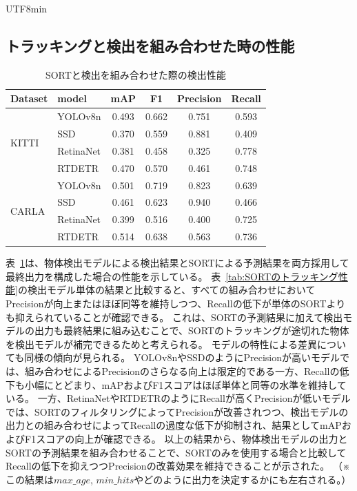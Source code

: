 \documentclass[conference, dvipdfmx]{IEEEtran}
\begin{document}
\begin{CJK}{UTF8}{min}
\subsection{トラッキングと検出を組み合わせた時の性能}
\begin{table}[htbp]
    \centering
    \caption{SORTと検出を組み合わせた際の検出性能}
    \begin{tabular}{llcccc}
         \toprule
         Dataset & 
         model        &  mAP  & F1    & Precision & Recall \\
         \midrule
         \multirow{4}{*}{KITTI} 
         & YOLOv8n    & 0.493 & 0.662 & 0.751     & 0.593 \\
         & SSD        & 0.370 & 0.559 & 0.881     & 0.409 \\
         & RetinaNet  & 0.381 & 0.458 & 0.325     & 0.778 \\
         & RTDETR     & 0.470 & 0.570 & 0.461     & 0.748 \\
         \midrule
         \multirow{4}{*}{CARLA}
         & YOLOv8n    & 0.501 & 0.719 & 0.823     & 0.639 \\
         & SSD        & 0.461 & 0.623 & 0.940     & 0.466 \\
         & RetinaNet  & 0.399 & 0.516 & 0.400     & 0.725 \\
         & RTDETR     & 0.514 & 0.638 & 0.563     & 0.736 \\
         \bottomrule
    \end{tabular}
    \label{tab:SORTと組み合わせた検出性能}
\end{table}
表~\ref{tab:SORTと組み合わせた検出性能}は、物体検出モデルによる検出結果とSORTによる予測結果を両方採用して最終出力を構成した場合の性能を示している。
表~\ref{tab:SORTのトラッキング性能}の検出モデル単体の結果と比較すると、すべての組み合わせにおいてPrecisionが向上またはほぼ同等を維持しつつ、Recallの低下が単体のSORTよりも抑えられていることが確認できる。
これは、SORTの予測結果に加えて検出モデルの出力も最終結果に組み込むことで、SORTのトラッキングが途切れた物体を検出モデルが補完できるためと考えられる。
モデルの特性による差異についても同様の傾向が見られる。
YOLOv8nやSSDのようにPrecisionが高いモデルでは、組み合わせによるPrecisionのさらなる向上は限定的である一方、Recallの低下も小幅にとどまり、mAPおよびF1スコアはほぼ単体と同等の水準を維持している。
一方、RetinaNetやRTDETRのようにRecallが高くPrecisionが低いモデルでは、SORTのフィルタリングによってPrecisionが改善されつつ、検出モデルの出力との組み合わせによってRecallの過度な低下が抑制され、結果としてmAPおよびF1スコアの向上が確認できる。
以上の結果から、物体検出モデルの出力とSORTの予測結果を組み合わせることで、SORTのみを使用する場合と比較してRecallの低下を抑えつつPrecisionの改善効果を維持できることが示された。
（※この結果は$max\_age$, $min\_hits$やどのように出力を決定するかにも左右される。）


\end{CJK}
\end{document}
